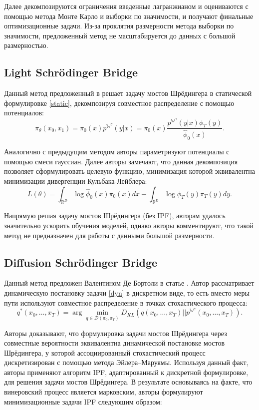 Далее декомпозируются ограничения введенные лагранжианом и оцениваются с помощью метода Монте Карло и выборки по значимости, и получают финальные оптимизационные задачи. Из-за проклятия размерности метода выборки по значимости, предложенный метод не масштабируется до данных с большой размерностью.

\subsection{Light Schrödinger Bridge}
Данный метод предложенный в \cite{lsb} решает задачу мостов Шрёдингера в статической формулировке \ref{static}, декомпозируя совместное распределение с помощью потенциалов:
\begin{equation*}
    \pi_{\theta}(x_0, x_1) = \pi_0(x) p^{\mathbb{W}^\gamma}(y|x) = \pi_0(x) \frac{p^{\mathbb{W}^\gamma}(y|x) \phi_T(y)}{\hat{\phi}_0(x)}.
\end{equation*}

Аналогично с предыдущим методом авторы параметризуют потенциалы с помощью смеси гауссиан. Далее авторы замечают, что данная декомпозиция позволяет сформулировать целевую функцию, минимизация которой эквивалентна минимизации дивергенции Кульбака-Лейблера:
\begin{equation*}
    L(\theta) = \int_{\mathbb{R}^D} \log \hat{\phi}_0(x) \pi_0(x)dx - \int_{\mathbb{R}^D} \log \phi_T(y) \pi_T(y) dy.
\end{equation*}

Напрямую решая задачу мостов Шрёдингера (без IPF), авторам удалось значительно ускорить обучения моделей, однако авторы комментируют, что такой метод не предназначен для работы с данными большой размерности.

\subsection{Diffusion Schrödinger Bridge}
Данный метод предложен Валентином Де Бортоли в статье \cite{dsb}. Автор рассматривает динамическую постановку задачи \ref{dyn} в дискретном виде, то есть вместо меры пути используют совместное распределение в точках стохастического процесса:
\begin{equation*}
    q^*(x_0, \ldots, x_T) = \arg \min_{q \in \mathcal{D}(\pi_0, \pi_T)} D_{KL}\left(q(x_0, \ldots, x_T) || p^{\mathbb{W}^\gamma}(x_0, \ldots, x_T)\right).
\end{equation*} 

Авторы доказывают, что формулировка задачи мостов Шрёдингера через совместные вероятности эквивалентна динамической постановке мостов Шрёдингера, у которой ассоциированный стохастический процесс дискретизирован с помощью метода Эйлера–Маруямы. Используя данный факт, авторы \cite{dsb} применяют алгоритм IPF, адаптированный к дискретной формулировке, для решения задачи мостов Шрёдингера. В результате основываясь на факте, что винеровский процесс является марковским, авторы формулируют минимизационные задачи IPF следующим образом:

